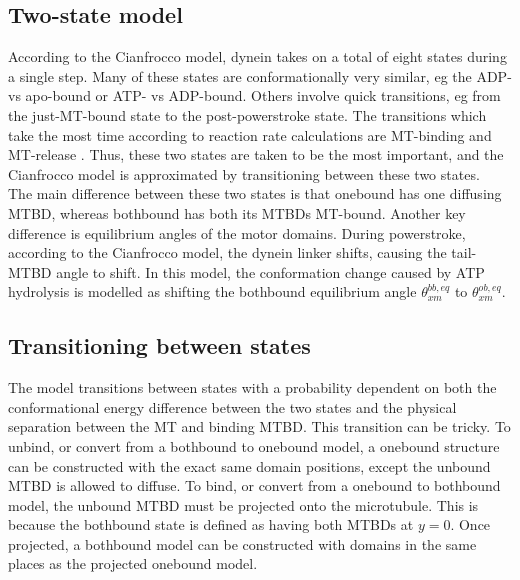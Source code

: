 \documentclass[
11pt, %
english, %
singlespacing, %
headsepline, %
chapterinoneline, %
]{MastersDoctoralThesis} %
\begin{document}
\subsection{Two-state model}
According to the Cianfrocco model, dynein takes on a total of eight states during a single step. Many of these states are conformationally very similar, eg the ADP- vs apo-bound or ATP- vs ADP-bound. Others involve quick transitions, eg from the just-MT-bound state to the post-powerstroke state. The transitions which take the most time according to reaction rate calculations are MT-binding and MT-release \cite{sarlahmodel}. Thus, these two states are taken to be the most important, and the Cianfrocco model is approximated by transitioning between these two states.\\

The main difference between these two states is that onebound has one diffusing MTBD, whereas bothbound has both its MTBDs MT-bound. Another key difference is equilibrium angles of the motor domains. During powerstroke, according to the Cianfrocco model, the dynein linker shifts, causing the tail-MTBD angle to shift. In this model, the conformation change caused by ATP hydrolysis is modelled as shifting the bothbound equilibrium angle $\theta_{xm}^{bb,eq}$ to $\theta_{xm}^{ob,eq}$.\\

\subsection{Transitioning between states}
The model transitions between states with a probability dependent on both the conformational energy difference between the two states and the physical separation between the MT and binding MTBD. This transition can be tricky. To unbind, or convert from a bothbound to onebound model, a onebound structure can be constructed with the exact same domain positions, except the unbound MTBD is allowed to diffuse. To bind, or convert from a onebound to bothbound model, the unbound MTBD must be projected onto the microtubule. This is because the bothbound state is defined as having both MTBDs at $y=0$. Once projected, a bothbound model can be constructed with domains in the same places as the projected onebound model.\\
\end{document}

